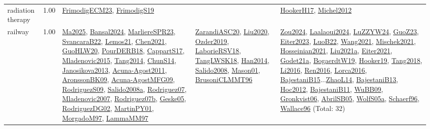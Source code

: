 {\begin{longtable}{p{3cm}r>{\raggedright\arraybackslash}p{6cm}>{\raggedright\arraybackslash}p{6cm}>{\raggedright\arraybackslash}p{8cm}}
\index{radiation therapy}\index{ApplicationAreas!radiation therapy}radiation therapy &  1.00 & \hyperref[detail:FrimodigECM23]{FrimodigECM23}, \hyperref[detail:FrimodigS19]{FrimodigS19} &  & \hyperref[detail:HookerH17]{HookerH17}, \hyperref[detail:Michel2012]{Michel2012}\\
\index{railway}\index{ApplicationAreas!railway}railway &  1.00 & \hyperref[detail:Ma2025]{Ma2025}, \hyperref[detail:Bansal2024]{Bansal2024}, \hyperref[detail:MarliereSPR23]{MarliereSPR23}, \hyperref[detail:SvancaraB22]{SvancaraB22}, \hyperref[detail:Lemos21]{Lemos21}, \hyperref[detail:Chen2021]{Chen2021}, \hyperref[detail:GuoHLW20]{GuoHLW20}, \hyperref[detail:PourDERB18]{PourDERB18}, \hyperref[detail:CappartS17]{CappartS17}, \hyperref[detail:Mladenovic2015]{Mladenovic2015}, \hyperref[detail:Tang2014]{Tang2014}, \hyperref[detail:ChunS14]{ChunS14}, \hyperref[detail:Janosikova2013]{Janosikova2013}, \hyperref[detail:Acuna-Agost2011]{Acuna-Agost2011}, \hyperref[detail:AronssonBK09]{AronssonBK09}, \hyperref[detail:Acuna-AgostMFG09]{Acuna-AgostMFG09}, \hyperref[detail:RodriguezS09]{RodriguezS09}, \hyperref[detail:Salido2008a]{Salido2008a}, \hyperref[detail:Rodriguez07]{Rodriguez07}, \hyperref[detail:Mladenovic2007]{Mladenovic2007}, \hyperref[detail:Rodriguez07b]{Rodriguez07b}, \hyperref[detail:Geske05]{Geske05}, \hyperref[detail:RodriguezDG02]{RodriguezDG02}, \hyperref[detail:MartinPY01]{MartinPY01}, \hyperref[detail:MorgadoM97]{MorgadoM97}, \hyperref[detail:LammaMM97]{LammaMM97} & \hyperref[detail:ZarandiASC20]{ZarandiASC20}, \hyperref[detail:Liu2020]{Liu2020}, \hyperref[detail:Ozder2019]{Ozder2019}, \hyperref[detail:LaborieRSV18]{LaborieRSV18}, \hyperref[detail:TangLWSK18]{TangLWSK18}, \hyperref[detail:Han2014]{Han2014}, \hyperref[detail:Salido2008]{Salido2008}, \hyperref[detail:Mason01]{Mason01}, \hyperref[detail:BrusoniCLMMT96]{BrusoniCLMMT96} & \hyperref[detail:Zou2024]{Zou2024}, \hyperref[detail:Laalaoui2024]{Laalaoui2024}, \hyperref[detail:LuZZYW24]{LuZZYW24}, \hyperref[detail:GuoZ23]{GuoZ23}, \hyperref[detail:Eiter2023]{Eiter2023}, \hyperref[detail:LuoB22]{LuoB22}, \hyperref[detail:Wang2021]{Wang2021}, \hyperref[detail:Mischek2021]{Mischek2021}, \hyperref[detail:Hosseinian2021]{Hosseinian2021}, \hyperref[detail:Liu2021a]{Liu2021a}, \hyperref[detail:Eiter2021]{Eiter2021}, \hyperref[detail:Godet21a]{Godet21a}, \hyperref[detail:BogaerdtW19]{BogaerdtW19}, \hyperref[detail:Hooker19]{Hooker19}, \hyperref[detail:Tang2018]{Tang2018}, \hyperref[detail:Li2016]{Li2016}, \hyperref[detail:Ren2016]{Ren2016}, \hyperref[detail:Lorca2016]{Lorca2016}, \hyperref[detail:BajestaniB15]{BajestaniB15}...\hyperref[detail:ZhaoL14]{ZhaoL14}, \hyperref[detail:BajestaniB13]{BajestaniB13}, \hyperref[detail:Hoc2012]{Hoc2012}, \hyperref[detail:BajestaniB11]{BajestaniB11}, \hyperref[detail:WuBB09]{WuBB09}, \hyperref[detail:Gronkvist06]{Gronkvist06}, \hyperref[detail:AbrilSB05]{AbrilSB05}, \hyperref[detail:WolfS05a]{WolfS05a}, \hyperref[detail:Schaerf96]{Schaerf96}, \hyperref[detail:Wallace96]{Wallace96} (Total: 32)\\

\end{longtable}}
